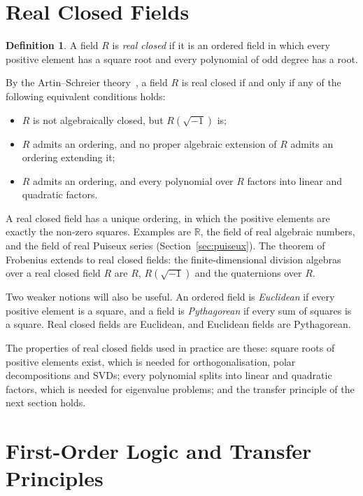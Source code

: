 \documentclass[12pt, a4paper]{report}
\theoremstyle{plain}
\theoremstyle{definition}
\newtheorem{definition}[theorem]{Definition}
\theoremstyle{remark}
\theoremstyle{plain}
\newcommand{\RR}{\mathbb{R}}
\begin{document}
\section{Real Closed Fields}
\label{sec:rcf}
\begin{definition}\label{def:rcf}
A field $R$ is \emph{real closed} if it is an ordered field in which every positive element has a square root and every polynomial of odd degree has a root.
\end{definition}

By the Artin--Schreier theory~\cite[\S1.2]{BochnakCosteRoy1998}, a field $R$ is real closed if and only if any of the following equivalent conditions holds:
\begin{itemize}[leftmargin=1.25em]
  \item $R$ is not algebraically closed, but $R(\sqrt{-1})$ is;
  \item $R$ admits an ordering, and no proper algebraic extension of $R$ admits an ordering extending it;
  \item $R$ admits an ordering, and every polynomial over $R$ factors into linear and quadratic factors.
\end{itemize}
A real closed field has a unique ordering, in which the positive elements are exactly the non-zero squares. Examples are $\RR$, the field of real algebraic numbers, and the field of real Puiseux series (Section~\ref{sec:puiseux}). The theorem of Frobenius extends to real closed fields: the finite-dimensional division algebras over a real closed field $R$ are $R$, $R(\sqrt{-1})$ and the quaternions over $R$.

Two weaker notions will also be useful. An ordered field is \emph{Euclidean} if every positive element is a square, and a field is \emph{Pythagorean} if every sum of squares is a square. Real closed fields are Euclidean, and Euclidean fields are Pythagorean.

The properties of real closed fields used in practice are these: square roots of positive elements exist, which is needed for orthogonalisation, polar decompositions and SVDs; every polynomial splits into linear and quadratic factors, which is needed for eigenvalue problems; and the transfer principle of the next section holds.

\section{First-Order Logic and Transfer Principles}
\label{sec:transfer}
\end{document}
